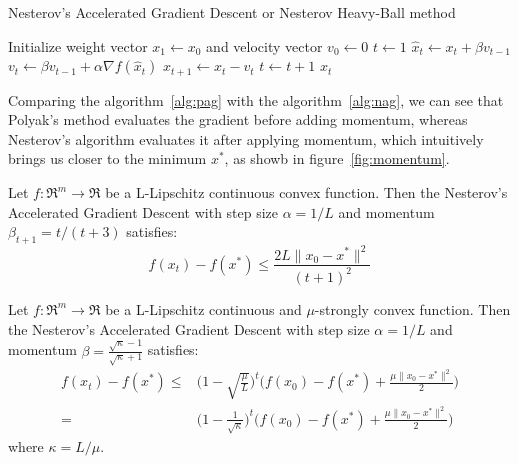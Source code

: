 \begin{algorithm}[H]
	\caption{Nesterov's Accelerated Gradient Descent or Nesterov Heavy-Ball method}
	\label{alg:nag}
	\begin{algorithmic}
		\Require{Momentum $\beta \in [0,1)$}
			\State Initialize weight vector $x_1 \gets x_0$ and velocity vector $v_0 \gets 0$
			\State $t \gets 1$
				\State $\hat{x}_t \gets x_t + \beta v_{t-1}$
				\State $v_t \gets \beta v_{t-1} + \alpha \nabla f(\hat{x}_t)$
				\State $x_{t+1} \gets x_t - v_t$
				\State $t \gets t + 1$
			\EndWhile
			\State \Return $x_t$
		\EndFunction
	\end{algorithmic}
\end{algorithm}

Comparing the algorithm~\ref{alg:pag} with the algorithm~\ref{alg:nag}, we can see that Polyak’s method evaluates the gradient before adding momentum, whereas Nesterov’s algorithm evaluates it after applying momentum, which intuitively brings us closer to the minimum $x^*$, as showb in figure~\ref{fig:momentum}.

\begin{theorem}[\href{http://www.princeton.edu/~yc5/ele522_optimization/lectures/accelerated_gradient.pdf\#page=31}{Nesterov's Accelerated Gradient Descent convergence for convex functions}] \label{thm:cvx_nag_convergence}
Let $f: \Re^m \rightarrow \Re$ be a L-Lipschitz continuous convex function. Then the Nesterov's Accelerated Gradient Descent with step size $\alpha = 1/L$ and momentum $\beta_{t+1} = t / (t+3)$ satisfies:
$$
f(x_t) - f(x^*) \leq \frac{2L \| x_0 - x^* \|^2}{(t+1)^2}
$$
\end{theorem}

\begin{theorem}[\href{http://www.princeton.edu/~yc5/ele522_optimization/lectures/accelerated_gradient.pdf\#page=38}{Nesterov's Accelerated Gradient Descent convergence for strongly convex functions}] \label{thm:str_cvx_nag_convergence}
Let $f: \Re^m \rightarrow \Re$ be a L-Lipschitz continuous and $\mu$-strongly convex function. Then the Nesterov's Accelerated Gradient Descent with step size $\alpha = 1/L$ and momentum $\beta = \displaystyle \frac{\sqrt{\kappa}-1}{\sqrt{\kappa}+1}$ satisfies:
$$
\begin{aligned}
	f(x_t) - f(x^*) \leq & \Bigg(1 - \sqrt{\frac{\mu}{L}}\Bigg)^t \Bigg(f(x_0) - f(x^*) + \frac{\mu \| x_0 - x^* \|^2}{2}\Bigg) \\
						= & \Bigg(1 - \frac{1}{\sqrt{\kappa}}\Bigg)^t \Bigg(f(x_0) - f(x^*) + \frac{\mu \| x_0 - x^* \|^2}{2}\Bigg)
\end{aligned}
$$
where $\kappa = L/\mu$.
\end{theorem}

